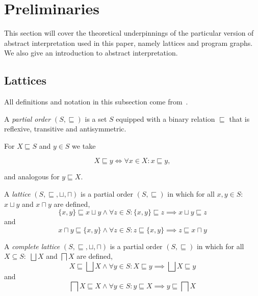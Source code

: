 
\section{Preliminaries}\label{sec:preliminaries}
This section will cover the theoretical underpinnings of the particular version of abstract interpretation used in this paper, namely lattices and program graphs.
We also give an introduction to abstract interpretation.

\subsection{Lattices}\label{subsec:lattices}
All definitions and notation in this subsection come from~\cite{moller_statitc_nodate}.


\begin{definition}
    A \emph{partial order} $(S, \sqsubseteq)$ is a set $S$ equipped with a binary relation $\sqsubseteq$ that is reflexive, transitive and antisymmetric.
\end{definition}


For $X \sqsubseteq S$ and $y \in S$ we take


\begin{equation}
    X \sqsubseteq y \iff \forall x \in X : x \sqsubseteq y,\label{eq:equation}
\end{equation}


and analogous for $y \sqsubseteq X$.


\begin{definition}
    A \emph{lattice} $(S, \sqsubseteq, \sqcup, \sqcap)$ is a partial order $(S, \sqsubseteq)$ in which for all $x,y \in S:$ $x \sqcup y$ and $x \sqcap y$ are defined,
    \begin{equation}
        \{x, y\} \sqsubseteq x \sqcup y \land \forall z \in S : \{x, y\} \sqsubseteq z \implies x \sqcup y \sqsubseteq z\label{eq:equation4}
    \end{equation}
    and
    \begin{equation}
        x \sqcap y \sqsubseteq \{x, y\} \land \forall z \in S : z \sqsubseteq \{x, y\} \implies z \sqsubseteq x \sqcap y\label{eq:equation5}
    \end{equation}
\end{definition}


\begin{definition}
    A \emph{complete lattice} $(S, \sqsubseteq, \sqcup, \sqcap)$ is a partial order $(S, \sqsubseteq)$ in which for all $X \subseteq S:$ $\bigsqcup X$ and $\bigsqcap X$ are defined,
    \begin{equation}
        X \sqsubseteq \bigsqcup X \land \forall y \in S : X \sqsubseteq y \implies \bigsqcup X \sqsubseteq y\label{eq:equation2}
    \end{equation}
    and
    \begin{equation}
        \bigsqcap X \sqsubseteq X \land \forall y \in S : y \sqsubseteq X \implies y \sqsubseteq \bigsqcap X\label{eq:equation3}
    \end{equation}
\end{definition}


